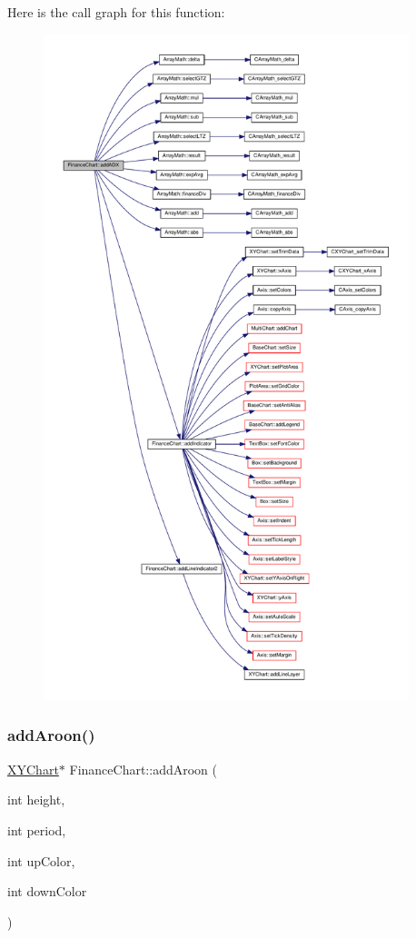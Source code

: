 Here is the call graph for this function\+:
\nopagebreak
\begin{figure}[H]
\begin{center}
\leavevmode
\includegraphics[height=550pt]{class_finance_chart_ad160627b8abe9c8c14175c93e4e54113_cgraph}
\end{center}
\end{figure}
\mbox{\label{class_finance_chart_a69096a6af74055fee5f1ae5fc0588a3b}} 
\subsubsection{\texorpdfstring{add\+Aroon()}{addAroon()}}
{\footnotesize\ttfamily \hyperlink{class_x_y_chart}{X\+Y\+Chart}$\ast$ Finance\+Chart\+::add\+Aroon (\begin{DoxyParamCaption}\item[{int}]{height,  }\item[{int}]{period,  }\item[{int}]{up\+Color,  }\item[{int}]{down\+Color }\end{DoxyParamCaption})\hspace{0.3cm}{\ttfamily [inline]}}



